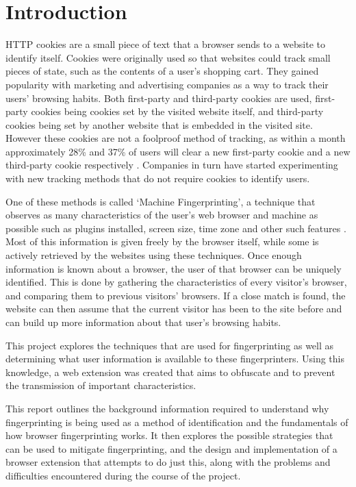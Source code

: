 \chapter{Introduction}

HTTP cookies are a small piece of text that a browser sends to a website to identify itself.
Cookies were originally used so that websites could track small pieces of state, such as the contents of a user's shopping cart.
They gained popularity with marketing and advertising companies as a way to track their users' browsing habits.
Both first-party and third-party cookies are used, first-party cookies being cookies set by the visited website itself, and third-party cookies being set by another website that is embedded in the visited site.
However these cookies are not a foolproof method of tracking, as within a month approximately 28\% and 37\% of users will clear a new first-party cookie and a new third-party cookie respectively \citep{comScore-cookies}.
Companies in turn have started experimenting with new tracking methods that do not require cookies to identify users.

One of these methods is called `Machine Fingerprinting', a technique that observes as many characteristics of the user's web browser and machine as possible such as plugins installed, screen size, time zone and other such features \citep{audio-fingerprint}.
Most of this information is given freely by the browser itself, while some is actively retrieved by the websites using these techniques.
Once enough information is known about a browser, the user of that browser can be uniquely identified.
This is done by gathering the characteristics of every visitor's browser, and comparing them to previous visitors' browsers.
If a close match is found, the website can then assume that the current visitor has been to the site before and can build up more information about that user's browsing habits.

This project explores the techniques that are used for fingerprinting as well as determining what user information is available to these fingerprinters.
Using this knowledge, a web extension was created that aims to obfuscate and to prevent the transmission of important characteristics.

This report outlines the background information required to understand why fingerprinting is being used as a method of identification and the fundamentals of how browser fingerprinting works.
It then explores the possible strategies that can be used to mitigate fingerprinting, and the design and implementation of a browser extension that attempts to do just this, along with the problems and difficulties encountered during the course of the project.

